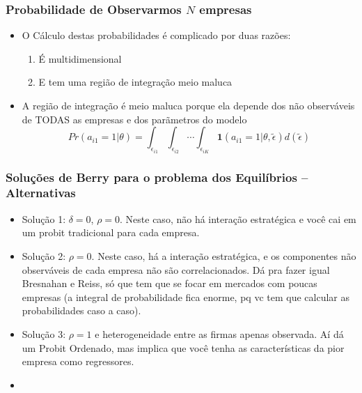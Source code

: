 \documentclass{beamer}
\begin{document}
\begin{frame}[fragile]\frametitle{Probabilidade de Observarmos $N$ empresas}
    
    \begin{itemize}
        \item O Cálculo destas probabilidades é complicado por duas razões:
        \begin{enumerate}
            \item É multidimensional
            \item E tem uma região de integração meio maluca
        \end{enumerate}
        \item A região de integração é meio maluca porque ela depende dos não observáveis de TODAS as empresas e dos parãmetros do modelo
        \[
        Pr(a_{i1}=1|\theta)=\int_{\epsilon_{i1}}\int_{\epsilon_{i2}}\cdots \int_{\epsilon_{iK}} \mathbf{1}(a_{i1}=1|\theta,\tilde{\epsilon})d(\tilde{\epsilon})
        \]
    \end{itemize}


\end{frame}


\begin{frame}[fragile]\frametitle{Soluções de Berry para o problema dos Equilíbrios -- Alternativas}

\begin{itemize}
    \item Solução 1: $\delta=0$, $\rho=0$. Neste caso, não há interação estratégica e você cai em um probit tradicional para cada empresa.
    \item Solução 2: $\rho=0$. Neste caso, há a interação estratégica, e os componentes não observáveis de cada empresa não são correlacionados. Dá pra fazer igual Bresnahan e Reiss, só que tem que se focar em mercados com poucas empresas (a integral de probabilidade fica enorme, pq vc tem que calcular as probabilidades caso a caso).
    \item Solução 3: $\rho=1$ e heterogeneidade entre as firmas apenas observada. Aí dá um Probit Ordenado, mas implica que você tenha as características da pior empresa como regressores.
    \item 
\end{itemize}
    


\end{frame}
\end{document}
